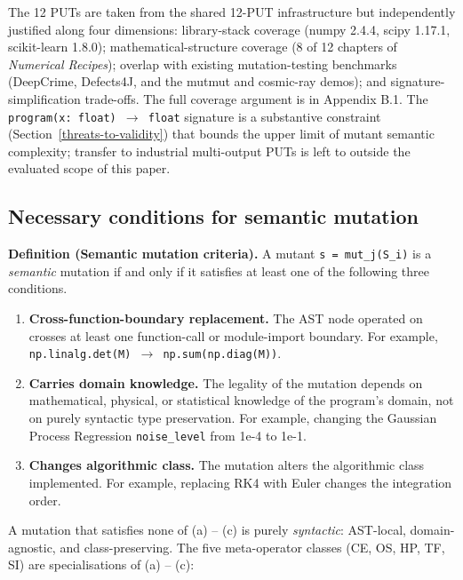 \documentclass[12pt]{article}
\newcounter{none}                   %
\begin{document}
The 12 PUTs are taken from the shared 12-PUT infrastructure \citep{ecf4ccd0f2897516b0205a4b1e35ea81b68aa277} but
independently justified along four dimensions: library-stack coverage
(numpy 2.4.4, scipy 1.17.1, scikit-learn 1.8.0); mathematical-structure
coverage (8 of 12 chapters of \emph{Numerical Recipes}); overlap with
existing mutation-testing benchmarks (DeepCrime, Defects4J, and the
mutmut and cosmic-ray demos); and signature-simplification trade-offs.
The full coverage argument is in Appendix B.1. The
\texttt{program(x:\ float)\ $\to$\ float} signature is a substantive
constraint (Section~\ref{threats-to-validity}) that bounds the upper limit of mutant semantic
complexity; transfer to industrial multi-output PUTs is left to
outside the evaluated scope of this paper.

\subsection{Necessary conditions for semantic mutation}\label{necessary-conditions-for-semantic-mutation-layer-1}

\textbf{Definition (Semantic mutation criteria).} A mutant
\texttt{s\textquotesingle{}\ =\ mut\_j(S\_i)} is a \emph{semantic}
mutation if and only if it satisfies at least one of the following three
conditions.

\begin{enumerate}
\item
  \textbf{Cross-function-boundary replacement.} The AST node operated on
  crosses at least one function-call or module-import boundary. For
  example, \texttt{np.linalg.det(M)\ $\to$\ np.sum(np.diag(M))}.
\item
  \textbf{Carries domain knowledge.} The legality of the mutation
  depends on mathematical, physical, or statistical knowledge of the
  program's domain, not on purely syntactic type preservation. For
  example, changing the Gaussian Process Regression
  \texttt{noise\_level} from 1e-4 to 1e-1.
\item
  \textbf{Changes algorithmic class.} The mutation alters the
  algorithmic class implemented. For example, replacing RK4 with Euler
  changes the integration order.
\end{enumerate}

A mutation that satisfies none of (a) -- (c) is purely \emph{syntactic}:
AST-local, domain-agnostic, and class-preserving. The five meta-operator
classes (CE, OS, HP, TF, SI) are specialisations of (a) -- (c):
\end{document}
